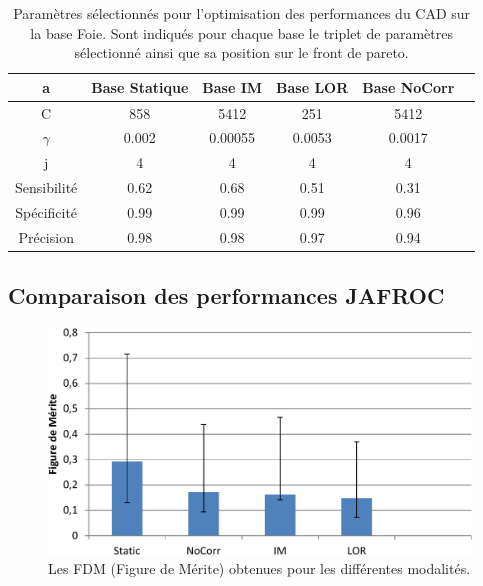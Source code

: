\begin{table}[h!]
\begin{center}
		\begin{tabular}{c| c c c c c}
  \hline
  a	& Base Statique	& Base IM	& Base LOR	& Base NoCorr	\\
  \hline
 C 	& 858		& 5412		& 251		& 5412		\\
\hline
$\gamma$& 0.002		& 0.00055	& 0.0053	& 0.0017	\\
\hline
j	& 4		& 4		& 4		& 4		\\
\hline
\hline
Sensibilité& 0.62	& 0.68		& 0.51		& 0.31	\\
\hline
Spécificité& 0.99	& 0.99		& 0.99		& 0.96		\\
\hline
Précision& 0.98		& 0.98		& 0.97		& 0.94		\\
\hline
 		\end{tabular}

\end{center}
\caption{Paramètres sélectionnés pour l'optimisation des performances du CAD sur la base Foie. Sont indiqués pour chaque base le triplet de paramètres sélectionné ainsi que sa position sur le front de pareto.}
\label{fig:paramsModFoie}
\end{table}


\subsection{Comparaison des performances JAFROC}

\begin{figure}[h!]
 \begin{center}
   \includegraphics[width=15cm]{images/FOM_mod19}
 \end{center}
 \caption{Les FDM (Figure de Mérite) obtenues pour les différentes modalités.}
 \label{fig:fom_mod19} 
\end{figure}


